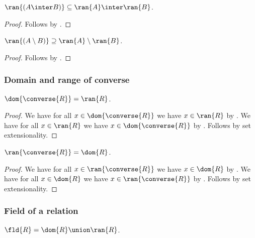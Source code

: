 \begin{proposition}\label{ran_inter}
    $\ran{(A\inter B)}\subseteq \ran{A}\inter\ran{B}$.
\end{proposition}
\begin{proof}
    Follows by .
\end{proof}

\begin{proposition}\label{ran_setminus}
    $\ran{(A\setminus B)}\supseteq \ran{A}\setminus\ran{B}$.
\end{proposition}
\begin{proof}
    Follows by .
\end{proof}

\subsubsection{Domain and range of converse}

\begin{proposition}\label{dom_converse}
    $\dom{\converse{R}} = \ran{R}$.
\end{proposition}
\begin{proof}
    We have for all $x\in\dom{\converse{R}}$ we have $x\in\ran{R}$
        by .
    We have for all $x\in\ran{R}$ we have $x\in\dom{\converse{R}}$
        by .
    Follows by set extensionality.
\end{proof}

\begin{proposition}\label{ran_converse}
    $\ran{\converse{R}} = \dom{R}$.
\end{proposition}
\begin{proof}
    We have for all $x\in\ran{\converse{R}}$ we have $x\in\dom{R}$
        by .
    We have for all $x\in\dom{R}$ we have $x\in\ran{\converse{R}}$
        by .
    Follows by set extensionality.
\end{proof}


\subsubsection{Field of a relation}

\begin{definition}\label{fld}
    $\fld{R} = \dom{R}\union\ran{R}$.
\end{definition}

